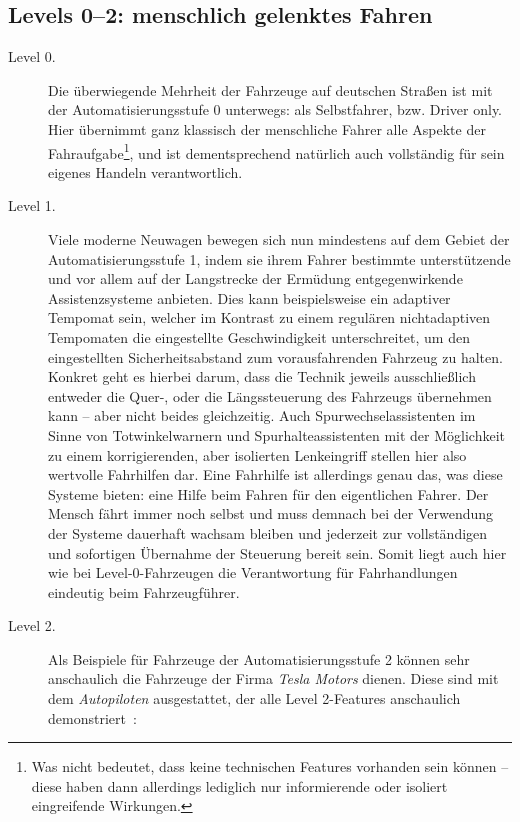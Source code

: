 \documentclass[twocolumn, german]{tum-article}
\begin{document}
\subsection{Levels 0--2: menschlich gelenktes Fahren}
\begin{description}
	\item[Level 0.] Die überwiegende Mehrheit der Fahrzeuge auf deutschen Straßen ist mit der Automatisierungsstufe 0 unterwegs: als Selbstfahrer, bzw. \glqq Driver only\grqq{}.
	Hier übernimmt ganz klassisch der menschliche Fahrer alle Aspekte der Fahraufgabe\footnote{Was nicht bedeutet, dass keine technischen Features vorhanden sein können -- diese haben dann allerdings lediglich nur informierende oder isoliert eingreifende Wirkungen.}, und ist dementsprechend natürlich auch vollständig für sein eigenes Handeln verantwortlich.
	
	
	\item[Level 1.] Viele moderne Neuwagen bewegen sich nun mindestens auf dem Gebiet der Automatisierungsstufe 1, indem sie ihrem Fahrer bestimmte unterstützende und vor allem auf der Langstrecke der Ermüdung entgegenwirkende Assistenzsysteme anbieten.
	Dies kann beispielsweise ein adaptiver Tempomat sein, welcher im Kontrast zu einem regulären nichtadaptiven Tempomaten die eingestellte Geschwindigkeit unterschreitet, um den eingestellten Sicherheitsabstand zum vorausfahrenden Fahrzeug zu halten.
	Konkret geht es hierbei darum, dass die Technik jeweils ausschließlich entweder die Quer-, oder die Längssteuerung des Fahrzeugs übernehmen kann -- aber nicht beides gleichzeitig.
	Auch Spurwechselassistenten im Sinne von Totwinkelwarnern und Spurhalteassistenten mit der Möglichkeit zu einem korrigierenden, aber isolierten Lenkeingriff stellen hier also wertvolle Fahrhilfen dar.
	Eine Fahrhilfe ist allerdings genau das, was diese Systeme bieten: eine Hilfe beim Fahren für den eigentlichen Fahrer.
	Der Mensch fährt immer noch selbst und muss demnach bei der Verwendung der Systeme dauerhaft wachsam bleiben und jederzeit zur vollständigen und sofortigen Übernahme der Steuerung bereit sein.
	Somit liegt auch hier wie bei Level-0-Fahrzeugen die Verantwortung für Fahrhandlungen eindeutig beim Fahrzeugführer.
	
	
	\item[Level 2.] Als Beispiele für Fahrzeuge der Automatisierungsstufe 2 können sehr anschaulich die Fahrzeuge der Firma \emph{Tesla Motors} dienen.
	Diese sind mit dem \emph{Autopiloten} ausgestattet, der alle Level 2-Features anschaulich demonstriert~\cite{tesla-ap}:
	

\end{description}
\end{document}
